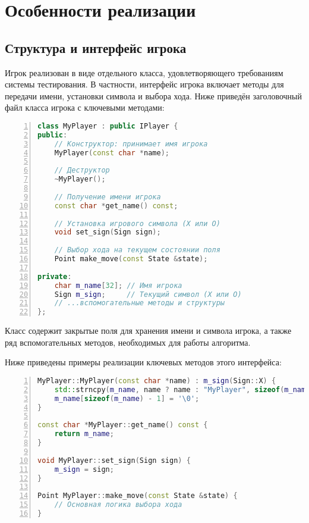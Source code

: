 \section{Особенности реализации}
\subsection{Структура и интерфейс игрока}

Игрок реализован в виде отдельного класса, удовлетворяющего требованиям системы тестирования. В частности, интерфейс игрока включает методы для передачи имени, установки символа и выбора хода. Ниже приведён заголовочный файл класса игрока с ключевыми методами:

\begin{lstlisting}[language=C++,numbers=left,caption={Заголовочный файл класса игрока},label={lst:myplayer_hpp}]
class MyPlayer : public IPlayer {
public:
    // Конструктор: принимает имя игрока
    MyPlayer(const char *name);

    // Деструктор
    ~MyPlayer();

    // Получение имени игрока
    const char *get_name() const;

    // Установка игрового символа (X или O)
    void set_sign(Sign sign);

    // Выбор хода на текущем состоянии поля
    Point make_move(const State &state);

private:
    char m_name[32]; // Имя игрока
    Sign m_sign;     // Текущий символ (X или O)
    // ...вспомогательные методы и структуры
};
\end{lstlisting}

\noindent Класс содержит закрытые поля для хранения имени и символа игрока, а также ряд вспомогательных методов, необходимых для работы алгоритма.

\bigskip

Ниже приведены примеры реализации ключевых методов этого интерфейса:

\begin{lstlisting}[language=C++,numbers=left,caption={Реализация основных методов класса MyPlayer},label={lst:myplayer_cpp}]
MyPlayer::MyPlayer(const char *name) : m_sign(Sign::X) {
    std::strncpy(m_name, name ? name : "MyPlayer", sizeof(m_name) - 1);
    m_name[sizeof(m_name) - 1] = '\0';
}

const char *MyPlayer::get_name() const {
    return m_name;
}

void MyPlayer::set_sign(Sign sign) {
    m_sign = sign;
}

Point MyPlayer::make_move(const State &state) {
    // Основная логика выбора хода
}
\end{lstlisting}

